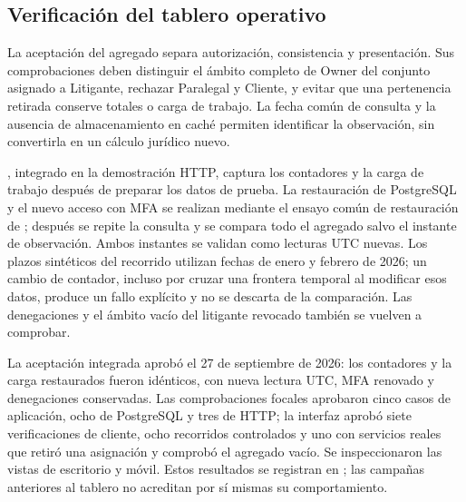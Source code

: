 \subsection{Verificación del tablero operativo}\label{sec:pruebas-tablero}

La aceptación del agregado separa autorización, consistencia y presentación. Sus comprobaciones deben distinguir el ámbito completo de Owner del conjunto asignado a Litigante, rechazar Paralegal y Cliente, y evitar que una pertenencia retirada conserve totales o carga de trabajo. La fecha común de consulta y la ausencia de almacenamiento en caché permiten identificar la observación, sin convertirla en un cálculo jurídico nuevo.

, integrado en la demostración HTTP, captura los contadores y la carga de trabajo después de preparar los datos de prueba. La restauración de PostgreSQL y el nuevo acceso con MFA se realizan mediante el ensayo común de restauración de ; después se repite la consulta y se compara todo el agregado salvo el instante de observación. Ambos instantes se validan como lecturas UTC nuevas. Los plazos sintéticos del recorrido utilizan fechas de enero y febrero de 2026; un cambio de contador, incluso por cruzar una frontera temporal al modificar esos datos, produce un fallo explícito y no se descarta de la comparación. Las denegaciones y el ámbito vacío del litigante revocado también se vuelven a comprobar.

La aceptación integrada aprobó el 27 de septiembre de 2026: los contadores y la carga restaurados fueron idénticos, con nueva lectura UTC, MFA renovado y denegaciones conservadas. Las comprobaciones focales aprobaron cinco casos de aplicación, ocho de PostgreSQL y tres de HTTP; la interfaz aprobó siete verificaciones de cliente, ocho recorridos controlados y uno con servicios reales que retiró una asignación y comprobó el agregado vacío. Se inspeccionaron las vistas de escritorio y móvil. Estos resultados se registran en ; las campañas anteriores al tablero no acreditan por sí mismas su comportamiento.
